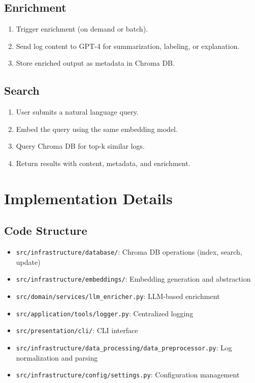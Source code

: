 \documentclass{article}
\begin{document}
\subsection{Enrichment}
\begin{enumerate}
    \item Trigger enrichment (on demand or batch).
    \item Send log content to GPT-4 for summarization, labeling, or explanation.
    \item Store enriched output as metadata in Chroma DB.
\end{enumerate}

\subsection{Search}
\begin{enumerate}
    \item User submits a natural language query.
    \item Embed the query using the same embedding model.
    \item Query Chroma DB for top-k similar logs.
    \item Return results with content, metadata, and enrichment.
\end{enumerate}

\section{Implementation Details}
\subsection{Code Structure}
\begin{itemize}
    \item \texttt{src/infrastructure/database/}: Chroma DB operations (index, search, update)
    \item \texttt{src/infrastructure/embeddings/}: Embedding generation and abstraction
    \item \texttt{src/domain/services/llm\_enricher.py}: LLM-based enrichment
    \item \texttt{src/application/tools/logger.py}: Centralized logging
    \item \texttt{src/presentation/cli/}: CLI interface
    \item \texttt{src/infrastructure/data\_processing/data\_preprocessor.py}: Log normalization and parsing
    \item \texttt{src/infrastructure/config/settings.py}: Configuration management
\end{itemize}
\end{document}
